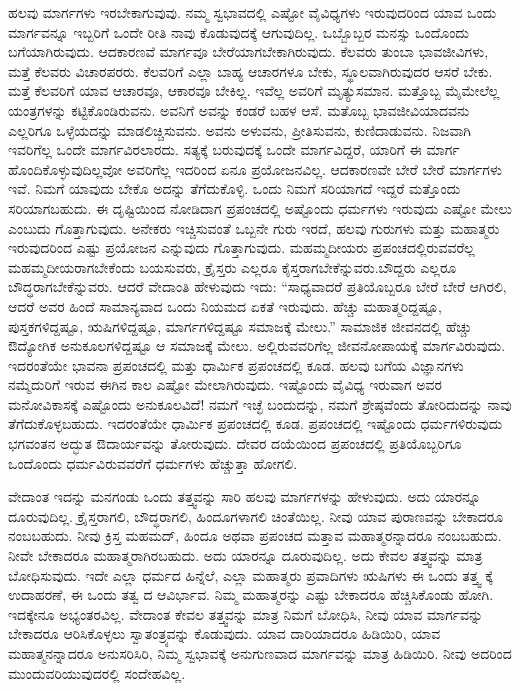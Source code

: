 ಹಲವು ಮಾರ್ಗಗಳು ಇರಬೇಕಾಗುವುವು. ನಮ್ಮ ಸ್ವಭಾವದಲ್ಲಿ ಎಷ್ಟೋ ವೈವಿಧ್ಯಗಳು ಇರುವುದರಿಂದ ಯಾವ ಒಂದು ಮಾರ್ಗವನ್ನೂ ಇಬ್ಬರಿಗೆ ಒಂದೇ ರೀತಿ ನಾವು ಕೊಡುವುದಕ್ಕೆ ಆಗುವುದಿಲ್ಲ. ಒಬ್ಬೊಬ್ಬರ ಮನಸ್ಸು ಒಂದೊಂದು ಬಗೆಯಾಗಿರುವುದು. ಆದಕಾರಣವೆ ಮಾರ್ಗವೂ ಬೇರೆಯಾಗಬೇಕಾಗಿರುವುದು. ಕೆಲವರು ತುಂಬಾ ಭಾವಜೀವಿಗಳು, ಮತ್ತೆ ಕೆಲವರು ವಿಚಾರಪರರು. ಕೆಲವರಿಗೆ ಎಲ್ಲಾ ಬಾಹ್ಯ ಆಚಾರಗಳೂ ಬೇಕು, ಸ್ಥೂಲವಾಗಿರುವುದರ ಆಸರೆ ಬೇಕು. ಮತ್ತೆ ಕೆಲವರಿಗೆ ಯಾವ ಆಚಾರವೂ, ಆಕಾರವೂ ಬೇಕಿಲ್ಲ. ಇವೆಲ್ಲ ಅವರಿಗೆ ಮೃತ್ಯುಸಮಾನ. ಮತ್ತೊಬ್ಬ ಮೈಮೇಲೆಲ್ಲ ಯಂತ್ರಗಳನ್ನು ಕಟ್ಟಿಕೊಂಡಿರುವನು. ಅವನಿಗೆ ಅವನ್ನು ಕಂಡರೆ ಬಹಳ ಆಸೆ. ಮತೊಬ್ಬ ಭಾವಜೀವಿಯಾದವನು ಎಲ್ಲರಿಗೂ ಒಳ್ಳೆಯದನ್ನು ಮಾಡಲಿಚ್ಚಿಸುವನು. ಅವನು ಅಳುವನು, ಪ್ರೀತಿಸುವನು, ಕುಣಿದಾಡುವನು. ನಿಜವಾಗಿ ಇವರಿಗೆಲ್ಲ ಒಂದೇ ಮಾರ್ಗವಿರಲಾರದು. ಸತ್ಯಕ್ಕೆ ಬರುವುದಕ್ಕೆ ಒಂದೇ ಮಾರ್ಗವಿದ್ದರೆ, ಯಾರಿಗೆ ಈ ಮಾರ್ಗ ಹೊಂದಿಕೊಳ್ಳುವುದಿಲ್ಲವೋ ಅವರಿಗೆಲ್ಲ ಇದರಿಂದ ಏನೂ ಪ್ರಯೋಜನವಿಲ್ಲ. ಆದಕಾರಣವೇ ಬೇರೆ ಬೇರೆ ಮಾರ್ಗಗಳು ಇವೆ. ನಿಮಗೆ ಯಾವುದು ಬೇಕೊ ಅದನ್ನು ತೆಗೆದುಕೊಳ್ಳಿ. ಒಂದು ನಿಮಗೆ ಸರಿಯಾಗದೆ ಇದ್ದರೆ ಮತ್ತೊಂದು ಸರಿಯಾಗಬಹುದು. ಈ ದೃಷ್ಟಿಯಿಂದ ನೋಡಿದಾಗ ಪ್ರಪಂಚದಲ್ಲಿ ಅಷ್ಟೊಂದು ಧರ್ಮಗಳು ಇರುವುದು ಎಷ್ಟೋ ಮೇಲು ಎಂಬುದು ಗೊತ್ತಾಗುವುದು. ಅನೇಕರು ಇಚ್ಚಿಸುವಂತೆ ಒಬ್ಬನೇ ಗುರು ಇರದೆ, ಹಲವು ಗುರುಗಳು ಮತ್ತು ಮಹಾತ್ಮರು ಇರುವುದರಿಂದ ಎಷ್ಟು ಪ್ರಯೋಜನ ಎನ್ನುವುದು ಗೊತ್ತಾಗುವುದು. ಮಹಮ್ಮದೀಯರು ಪ್ರಪಂಚದಲ್ಲಿರುವವರೆಲ್ಲ ಮಹಮ್ಮದೀಯರಾಗಬೇಕೆಂದು ಬಯಸುವರು, ಕ್ರೈಸ್ತರು ಎಲ್ಲರೂ ಕೈಸ್ತರಾಗಬೇಕೆನ್ನುವರು.\break ಬೌದ್ದರು ಎಲ್ಲರೂ ಬೌದ್ಧರಾಗಬೇಕೆನ್ನುವರು. ಆದರೆ ವೇದಾಂತಿ ಹೇಳುವುದು ಇದು: “ಸಾಧ್ಯವಾದರೆ ಪ್ರತಿಯೊಬ್ಬರೂ ಬೇರೆ ಬೇರೆ ಆಗಿರಲಿ, ಆದರೆ ಅವರ ಹಿಂದೆ ಸಾಮಾನ್ಯವಾದ ಒಂದು ನಿಯಮದ ಏಕತೆ ಇರುವುದು. ಹೆಚ್ಚು ಮಹಾತ್ಮರಿದ್ದಷ್ಟೂ, ಪುಸ್ತಕಗಳಿದ್ದಷ್ಟೂ, ಋಷಿಗಳಿದ್ದಷ್ಟೂ, ಮಾರ್ಗಗಳಿದ್ದಷ್ಟೂ ಸಮಾಜಕ್ಕೆ ಮೇಲು.” ಸಾಮಾಜಿಕ ಜೀವನದಲ್ಲಿ ಹೆಚ್ಚು ಔದ್ಯೋಗಿಕ ಅನುಕೂಲಗಳಿದ್ದಷ್ಟೂ ಆ ಸಮಾಜಕ್ಕೆ ಮೇಲು. ಅಲ್ಲಿರುವವರಿಗೆಲ್ಲ ಜೀವನೋಪಾಯಕ್ಕೆ ಮಾರ್ಗವಿರುವುದು. ಇದರಂತೆಯೇ ಭಾವನಾ ಪ್ರಪಂಚದಲ್ಲಿ ಮತ್ತು ಧಾರ್ಮಿಕ ಪ್ರಪಂಚದಲ್ಲಿ ಕೂಡ. ಹಲವು ಬಗೆಯ ವಿಜ್ಞಾನಗಳು ನಮ್ಮೆದುರಿಗೆ ಇರುವ ಈಗಿನ ಕಾಲ ಎಷ್ಟೋ ಮೇಲಾಗಿರುವುದು. ಇಷ್ಟೊಂದು ವೈವಿಧ್ಯ ಇರುವಾಗ ಅವರ ಮನೋವಿಕಾಸಕ್ಕೆ ಎಷ್ಟೊಂದು ಅನುಕೂಲವಿದೆ! ನಮಗೆ ಇಚ್ಛೆ ಬಂದುದನ್ನು, ನಮಗೆ ಶ್ರೇಷ್ಠವೆಂದು ತೋರಿದುದನ್ನು ನಾವು ತೆಗೆದುಕೊಳ್ಳಬಹುದು. ಇದರಂತೆಯೇ ಧಾರ್ಮಿಕ ಪ್ರಪಂಚದಲ್ಲಿ ಕೂಡ. ಪ್ರಪಂಚದಲ್ಲಿ ಇಷ್ಟೊಂದು ಧರ್ಮಗಳಿರುವುದು ಭಗವಂತನ ಅದ್ಭುತ ಔದಾರ್ಯವನ್ನು ತೋರುವುದು. ದೇವರ ದಯೆಯಿಂದ ಪ್ರಪಂಚದಲ್ಲಿ ಪ್ರತಿಯೊಬ್ಬರಿಗೂ ಒಂದೊಂದು ಧರ್ಮವಿರುವವರೆಗೆ ಧರ್ಮಗಳು ಹೆಚ್ಚುತ್ತಾ ಹೋಗಲಿ.

ವೇದಾಂತ ಇದನ್ನು ಮನಗಂಡು ಒಂದು ತತ್ತ್ವವನ್ನು ಸಾರಿ ಹಲವು ಮಾರ್ಗಗಳನ್ನು ಹೇಳುವುದು. ಅದು ಯಾರನ್ನೂ ದೂರುವುದಿಲ್ಲ. ಕ್ರೈಸ್ತರಾಗಲಿ, ಬೌದ್ಧರಾಗಲಿ, ಹಿಂದೂಗಳಾಗಲಿ ಚಿಂತೆಯಿಲ್ಲ. ನೀವು ಯಾವ ಪುರಾಣವನ್ನು ಬೇಕಾದರೂ ನಂಬಬಹುದು. ನೀವು ಕ್ರಿಸ್ತ ಮಹಮದ್, ಹಿಂದೂ ಅಥವಾ ಪ್ರಪಂಚದ ಮತ್ತಾವ ಮಹಾತ್ಮರನ್ನಾದರೂ ನಂಬಬಹುದು. ನೀವೇ ಬೇಕಾದರೂ ಮಹಾತ್ಮರಾಗಿರಬಹುದು. ಅದು ಯಾರನ್ನೂ ದೂರುವುದಿಲ್ಲ. ಅದು ಕೇವಲ ತತ್ತ್ವವನ್ನು ಮಾತ್ರ ಬೋಧಿಸುವುದು. ಇದೇ ಎಲ್ಲಾ ಧರ್ಮದ ಹಿನ್ನೆಲೆ, ಎಲ್ಲಾ ಮಹಾತ್ಮರು ಪ್ರವಾದಿಗಳು ಋಷಿಗಳು ಈ ಒಂದು ತತ್ತ್ವ ಕ್ಕೆ ಉದಾಹರಣೆ, ಈ ಒಂದು ತತ್ವ ದ ಆವಿರ್ಭಾವ. ನಿಮ್ಮ ಮಹಾತ್ಮರನ್ನು ಎಷ್ಟು ಬೇಕಾದರೂ ಹೆಚ್ಚಿಸಿಕೊಂಡು ಹೋಗಿ. ಇದಕ್ಕೇನೂ ಅಭ್ಯಂತರವಿಲ್ಲ. ವೇದಾಂತ ಕೇವಲ ತತ್ತ್ವವನ್ನು ಮಾತ್ರ ನಿಮಗೆ ಬೋಧಿಸಿ, ನೀವು ಯಾವ ಮಾರ್ಗವನ್ನು ಬೇಕಾದರೂ ಆರಿಸಿಕೊಳ್ಳಲು ಸ್ವಾತಂತ್ರ್ಯವನ್ನು ಕೊಡುವುದು. ಯಾವ ದಾರಿಯಾದರೂ ಹಿಡಿಯಿರಿ, ಯಾವ ಮಹಾತ್ಮನನ್ನಾದರೂ ಅನುಸರಿಸಿರಿ, ನಿಮ್ಮ ಸ್ವಭಾವಕ್ಕೆ ಅನುಗುಣವಾದ ಮಾರ್ಗವನ್ನು ಮಾತ್ರ ಹಿಡಿಯಿರಿ. ನೀವು ಅದರಿಂದ ಮುಂದುವರಿಯುವುದರಲ್ಲಿ ಸಂದೇಹವಿಲ್ಲ.

